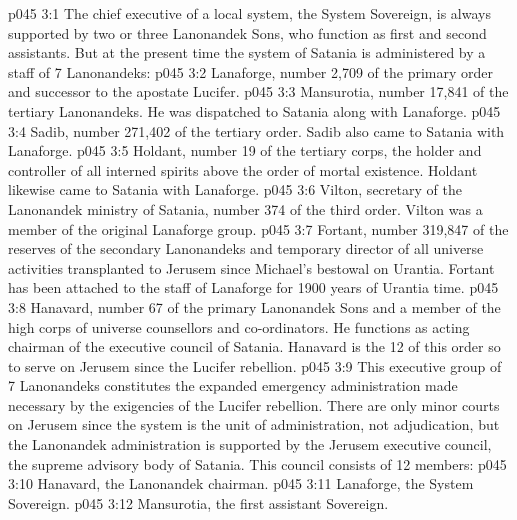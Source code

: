 \vs p045 3:1 The chief executive of a local system, the System Sovereign, is always supported by two or three Lanonandek Sons, who function as first and second assistants. But at the present time the system of Satania is administered by a staff of 7 Lanonandeks:
\vs p045 3:2 \bibnobreakspace {} Lanaforge, number 2,709 of the primary order and successor to the apostate Lucifer.
\vs p045 3:3 \bibnobreakspace {} Mansurotia, number 17,841 of the tertiary Lanonandeks. He was dispatched to Satania along with Lanaforge.
\vs p045 3:4 \bibnobreakspace {} Sadib, number 271,402 of the tertiary order. Sadib also came to Satania with Lanaforge.
\vs p045 3:5 \bibnobreakspace {} Holdant, number 19 of the tertiary corps, the holder and controller of all interned spirits above the order of mortal existence. Holdant likewise came to Satania with Lanaforge.
\vs p045 3:6 \bibnobreakspace {} Vilton, secretary of the Lanonandek ministry of Satania, number 374 of the third order. Vilton was a member of the original Lanaforge group.
\vs p045 3:7 \bibnobreakspace {} Fortant, number 319,847 of the reserves of the secondary Lanonandeks and temporary director of all universe activities transplanted to Jerusem since Michael’s bestowal on Urantia. Fortant has been attached to the staff of Lanaforge for 1900 years of Urantia time.
\vs p045 3:8 \bibnobreakspace {} Hanavard, number 67 of the primary Lanonandek Sons and a member of the high corps of universe counsellors and co\hyp{}ordinators. He functions as acting chairman of the executive council of Satania. Hanavard is the 12 of this order so to serve on Jerusem since the Lucifer rebellion.
\vs p045 3:9 \pc This executive group of 7 Lanonandeks constitutes the expanded emergency administration made necessary by the exigencies of the Lucifer rebellion. There are only minor courts on Jerusem since the system is the unit of administration, not adjudication, but the Lanonandek administration is supported by the Jerusem executive council, the supreme advisory body of Satania. This council consists of 12 members:
\vs p045 3:10 \bibnobreakspace Hanavard, the Lanonandek chairman.
\vs p045 3:11 \bibnobreakspace Lanaforge, the System Sovereign.
\vs p045 3:12 \bibnobreakspace Mansurotia, the first assistant Sovereign.
